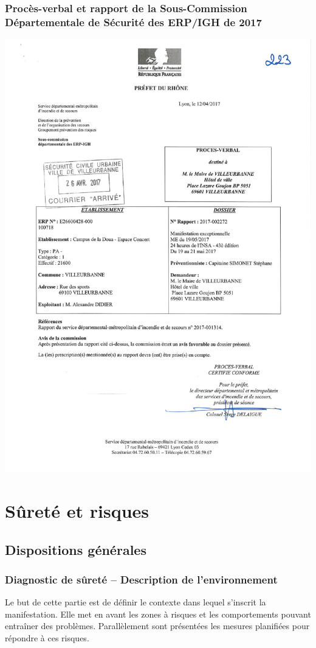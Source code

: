 \documentclass[hidelinks, paper=a4, fontsize=13pt]{report}
\begin{document}
\subsection{Procès-verbal et rapport de la Sous-Commission Départementale de Sécurité des ERP/IGH de 2017}
\begin{center}
	\includegraphics[width=.75\textwidth,keepaspectratio,page=1]{Annexes/Documents/Proces_Verbal_SCDS_2017}
\end{center}


\chapter{Sûreté et risques}
\section{Dispositions générales}
\subsection{Diagnostic de sûreté – Description de l’environnement}
Le but de cette partie est de définir le contexte dans lequel s’inscrit la manifestation. Elle met en avant les zones à risques et les comportements pouvant entraîner des problèmes. Parallèlement sont présentées les mesures planifiées pour répondre à ces risques.
\end{document}
